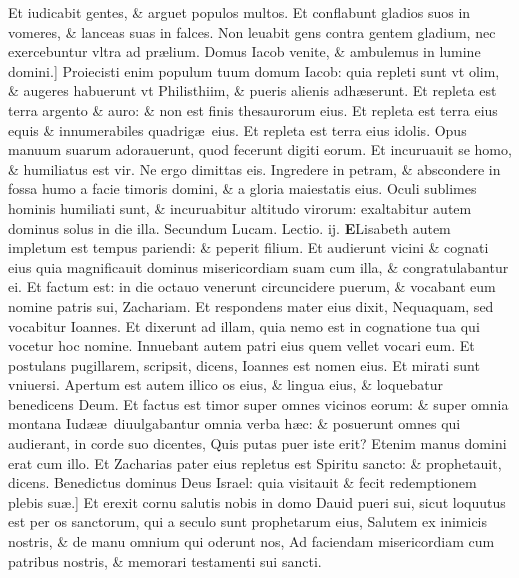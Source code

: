\documentclass[a5paper,10pt]{book}
\def\leftmarginnote{%
	\lrmarginnote{\hskip -\marginparsep \hskip -6.5em}}
\def\rightmarginnote{%
	\lrmarginnote{\hskip\columnwidth \hskip -1em}}
\def\ae{æ}
\begin{document}
\begin{multicols*}{2}
Et iudicabit gentes, \& arguet populos multos. Et conflabunt gladios suos in vomeres, \& lanceas suas in falces.
Non leuabit gens contra gentem gladium, nec exercebuntur vltra ad pr\ae lium.
Domus Iacob venite, \& ambulemus in lumine domini.]
Proiecisti\leftmarginnote{\begin{flushright}B\end{flushright}} enim populum tuum domum Iacob: quia repleti sunt vt olim, \& augeres habuerunt vt Philisthiim, \& pueris alienis adh\ae serunt.
Et repleta est terra argento \& auro: \& non est finis thesaurorum eius. Et repleta est terra eius equis \& innumerabiles quadrig\ae \ eius. Et repleta est terra eius idolis.
Opus manuum suarum adorauerunt, quod fecerunt digiti eorum. Et incuruauit se homo, \& humiliatus est vir.
Ne ergo dimittas eis.
Ingredere in petram, \& abscondere in fossa humo a facie timoris domini, \& a gloria maiestatis eius.
Oculi sublimes hominis humiliati sunt, \& incuruabitur altitudo virorum: exaltabitur autem dominus solus in die illa.
\color{red} Secundum Lucam. \hfill Lectio. ij.\color{black}
\vspace{-.25em}
\lettrine[lines=2]{\bfseries \color{red} E}{}\textdagger Lisabeth\rightmarginnote{c.1.f} autem impletum est tempus pariendi: \& peperit filium.
Et audierunt vicini \& cognati eius quia magnificauit dominus misericordiam suam cum illa, \& congratulabantur ei.
Et factum est: in die octauo venerunt circuncidere puerum, \& vocabant eum nomine patris sui, Zachariam.
Et respondens mater eius dixit, Nequaquam, sed vocabitur Ioannes.
Et dixerunt ad illam, quia nemo est in cognatione tua qui vocetur hoc nomine.
Innuebant autem patri eius quem vellet vocari eum.
Et postulans pugillarem, scripsit, dicens, Ioannes est nomen eius. Et mirati sunt vniuersi.
Apertum est autem illico os eius, \& lingua eius, \& loquebatur benedicens Deum.
Et factus est timor super omnes vicinos eorum: \& super omnia montana Iud\ae \ae \ diuulgabantur omnia verba h\ae c: \& posuerunt omnes qui audierant, in corde suo dicentes, Quis putas puer iste erit? Etenim manus domini erat cum illo.
Et Zacharias pater eius repletus est Spiritu sancto: \& prophetauit, dicens.
Benedictus dominus Deus Israel: quia visitauit \& fecit redemptionem plebis su\ae .]
Et erexit cornu salutis nobis in domo Dauid pueri sui, sicut loquutus est per os sanctorum, qui a seculo sunt prophetarum eius, Salutem ex inimicis nostris, \& de manu omnium qui oderunt nos, Ad faciendam misericordiam cum patribus nostris, \& memorari testamenti sui sancti.

\end{multicols*}
\end{document}
